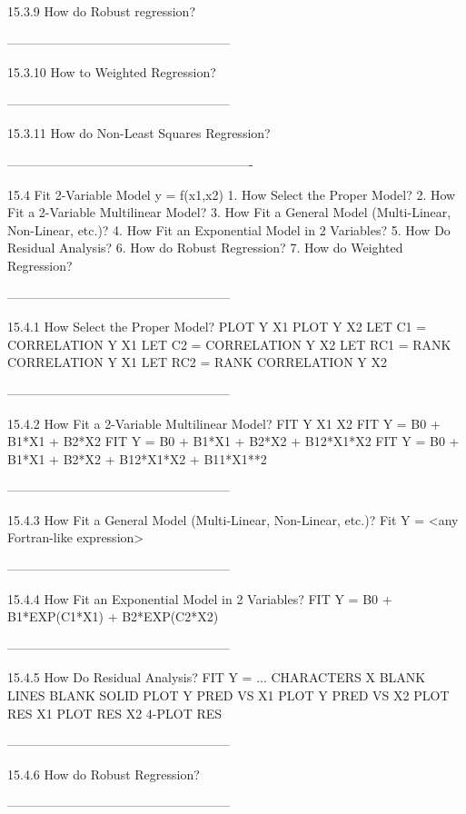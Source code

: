 15.3.9
How do Robust regression?
 
-----------------------------------------------------
 
15.3.10
How to Weighted Regression?
 
-----------------------------------------------------
 
15.3.11
How do Non-Least Squares Regression?
 
----------------------------------------------------------
 
15.4
Fit 2-Variable Model y = f(x1,x2)
   1. How Select the Proper Model?
   2. How Fit a 2-Variable Multilinear Model?
   3. How Fit a General Model (Multi-Linear, Non-Linear, etc.)?
   4. How Fit an Exponential Model in 2 Variables?
   5. How Do Residual Analysis?
   6. How do Robust Regression?
   7. How do Weighted Regression?
 
-----------------------------------------------------
 
15.4.1
How Select the Proper Model?
      PLOT Y X1
      PLOT Y X2
      LET C1 = CORRELATION Y X1
      LET C2 = CORRELATION Y X2
      LET RC1 = RANK CORRELATION Y X1
      LET RC2 = RANK CORRELATION Y X2
 
-----------------------------------------------------
 
15.4.2
How Fit a 2-Variable Multilinear Model?
      FIT Y X1 X2
      FIT Y = B0 + B1*X1 + B2*X2
      FIT Y = B0 + B1*X1 + B2*X2 + B12*X1*X2
      FIT Y = B0 + B1*X1 + B2*X2 + B12*X1*X2 + B11*X1**2
 
-----------------------------------------------------
 
15.4.3
How Fit a General Model (Multi-Linear, Non-Linear, etc.)?
      Fit Y = <any Fortran-like expression>
 
-----------------------------------------------------
 
15.4.4
How Fit an Exponential Model in 2 Variables?
      FIT Y = B0 + B1*EXP(C1*X1) + B2*EXP(C2*X2)
 
-----------------------------------------------------
 
15.4.5
How Do Residual Analysis?
      FIT Y = ...
      CHARACTERS X BLANK
      LINES BLANK SOLID
      PLOT Y PRED VS X1
      PLOT Y PRED VS X2
      PLOT RES X1
      PLOT RES X2
      4-PLOT RES
 
-----------------------------------------------------
 
15.4.6
How do Robust Regression?
 
-----------------------------------------------------
 
